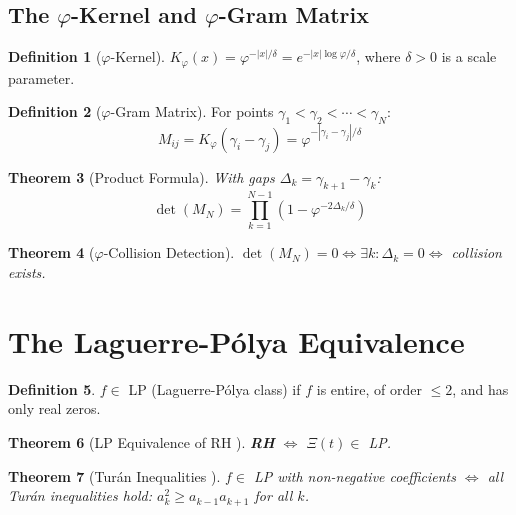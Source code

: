 \documentclass[11pt,a4paper]{article}
\newtheorem{theorem}{Theorem}[section]
\theoremstyle{definition}
\newtheorem{definition}[theorem]{Definition}
\theoremstyle{remark}
\newcommand{\vp}{\varphi}
\begin{document}
\subsection{The $\vp$-Kernel and $\vp$-Gram Matrix}

\begin{definition}[$\vp$-Kernel]
$K_\vp(x) = \vp^{-|x|/\delta} = e^{-|x|\log\vp/\delta}$, where $\delta > 0$ is a scale parameter.
\end{definition}

\begin{definition}[$\vp$-Gram Matrix]
For points $\gamma_1 < \gamma_2 < \cdots < \gamma_N$:
\begin{equation}
M_{ij} = K_\vp(\gamma_i - \gamma_j) = \vp^{-|\gamma_i - \gamma_j|/\delta}
\end{equation}
\end{definition}

\begin{theorem}[Product Formula]
With gaps $\Delta_k = \gamma_{k+1} - \gamma_k$:
\begin{equation}
\det(M_N) = \prod_{k=1}^{N-1}\left(1 - \vp^{-2\Delta_k/\delta}\right)
\end{equation}
\end{theorem}

\begin{theorem}[$\vp$-Collision Detection]
$\det(M_N) = 0 \iff \exists k : \Delta_k = 0 \iff$ collision exists.
\end{theorem}

\section{The Laguerre-P\'olya Equivalence}

\begin{definition}
$f \in$ LP (Laguerre-P\'olya class) if $f$ is entire, of order $\leq 2$, and has only real zeros.
\end{definition}

\begin{theorem}[LP Equivalence of RH {\cite{polya1927}}]
\textbf{RH} $\iff$ $\Xi(t) \in$ LP.
\end{theorem}

\begin{theorem}[Tur\'an Inequalities {\cite{csordas1986}}]
$f \in$ LP with non-negative coefficients $\iff$ all Tur\'an inequalities hold: $a_k^2 \geq a_{k-1}a_{k+1}$ for all $k$.
\end{theorem}
\end{document}

